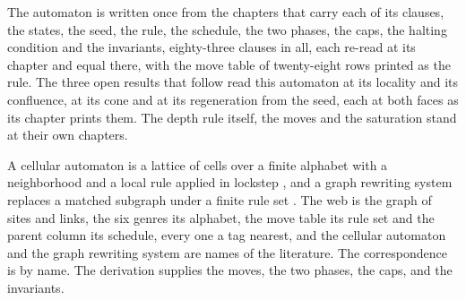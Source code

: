 \chdeps{}{}
The automaton is written once from the chapters that carry each of its clauses, the states, the seed, the rule, the schedule, the two phases, the caps, the halting condition and the invariants, eighty-three clauses in all, each re-read at its chapter and equal there, with the move table of twenty-eight rows printed as the rule. The three open results that follow read this automaton at its locality and its confluence, at its cone and at its regeneration from the seed, each at both faces as its chapter prints them. The depth rule itself, the moves and the saturation stand at their own chapters.
\begin{chbridge}
A cellular automaton is a lattice of cells over a finite alphabet with a neighborhood and a local rule applied in lockstep \cite{vonNeumann1966}, and a graph rewriting system replaces a matched subgraph under a finite rule set \cite{Rozenberg1997}. The web is the graph of sites and links, the six genres its alphabet, the move table its rule set and the parent column its schedule, every one a tag nearest, and the cellular automaton and the graph rewriting system are names of the literature. The correspondence is by name. The derivation supplies the moves, the two phases, the caps, and the invariants.
\end{chbridge}

